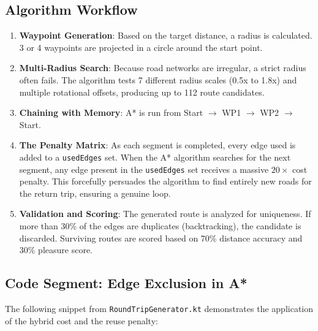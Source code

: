 \documentclass[12pt,a4paper,oneside]{report}
\begin{document}
\subsection{Algorithm Workflow}
\begin{enumerate}
    \item \textbf{Waypoint Generation}: Based on the target distance, a radius is calculated. 3 or 4 waypoints are projected in a circle around the start point.
    \item \textbf{Multi-Radius Search}: Because road networks are irregular, a strict radius often fails. The algorithm tests 7 different radius scales (0.5x to 1.8x) and multiple rotational offsets, producing up to 112 route candidates.
    \item \textbf{Chaining with Memory}: A* is run from Start $\rightarrow$ WP1 $\rightarrow$ WP2 $\rightarrow$ Start.
    \item \textbf{The Penalty Matrix}: As each segment is completed, every edge used is added to a \texttt{usedEdges} set. When the A* algorithm searches for the next segment, any edge present in the \texttt{usedEdges} set receives a massive $20\times$ cost penalty. This forcefully persuades the algorithm to find entirely new roads for the return trip, ensuring a genuine loop.
    \item \textbf{Validation and Scoring}: The generated route is analyzed for uniqueness. If more than 30\% of the edges are duplicates (backtracking), the candidate is discarded. Surviving routes are scored based on 70\% distance accuracy and 30\% pleasure score.
\end{enumerate}

\subsection{Code Segment: Edge Exclusion in A*}
The following snippet from \texttt{RoundTripGenerator.kt} demonstrates the application of the hybrid cost and the reuse penalty:
\end{document}
